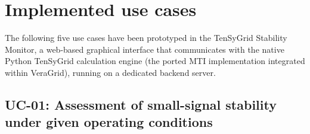 \section{Implemented use cases}

The following five use cases have been prototyped in the TenSyGrid Stability Monitor, a web-based graphical interface that communicates with the native Python TenSyGrid calculation engine (the ported MTI implementation integrated within VeraGrid), running on a dedicated backend server. 

\subsection{UC-01: Assessment of small-signal stability under given operating conditions}

